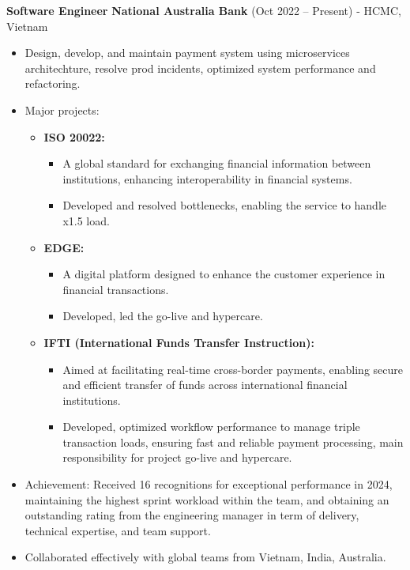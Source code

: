 \documentclass[11pt,a4paper]{article}
\begin{document}
\textbf{Software Engineer} \hfill \textbf{National Australia Bank} (Oct 2022 – Present) - HCMC, Vietnam  
\begin{itemize}[leftmargin=*]
    \item Design, develop, and maintain payment system using microservices architechture, resolve prod incidents, optimized system performance and refactoring.
    \item Major projects:  
\begin{itemize}[leftmargin=*]
    \item \textbf{ISO 20022:} 
    \begin{itemize}
        \item A global standard for exchanging financial information between institutions, enhancing interoperability in financial systems.
        \item Developed and resolved bottlenecks, enabling the service to handle x1.5 load.
    \end{itemize}

    \item \textbf{EDGE:} 
    \begin{itemize}
        \item A digital platform designed to enhance the customer experience in financial transactions.
        \item Developed, led the go-live and hypercare.
    \end{itemize}

    \item \textbf{IFTI (International Funds Transfer Instruction):} 
    \begin{itemize}
        \item Aimed at facilitating real-time cross-border payments, enabling secure and efficient transfer of funds across international financial institutions.
        \item Developed, optimized workflow performance to manage triple transaction loads, ensuring fast and reliable payment processing, main responsibility for project go-live and hypercare.
    \end{itemize}
\end{itemize}

    \item {Achievement:} Received 16 recognitions for exceptional performance in 2024, maintaining the highest sprint workload within the team, and obtaining an outstanding rating from the engineering manager in term of delivery, technical expertise, and team support.

    \item Collaborated effectively with global teams from Vietnam, India, Australia.
\end{itemize}
\end{document}
